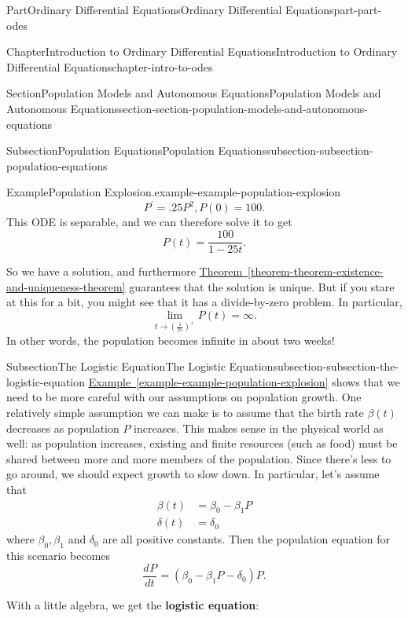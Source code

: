 \documentclass[twoside,10pt,]{book}
\newcommand{\xreffont}{\relax}
\newcommand{\terminology}[1]{\textbf{#1}}
\numberwithin{equation}{part}
\newcommand{\dv}[3][]{\dfrac{d^{#1} #2}{d #3^{#1}}}
\begin{document}
\begin{partptx}{Part}{Ordinary Differential Equations}{}{Ordinary Differential Equations}{}{}{part-part-odes}
\begin{chapterptx}{Chapter}{Introduction to Ordinary Differential Equations}{}{Introduction to Ordinary Differential Equations}{}{}{chapter-intro-to-odes}
\begin{sectionptx}{Section}{Population Models and Autonomous Equations}{}{Population Models and Autonomous Equations}{}{}{section-section-population-models-and-autonomous-equations}
\begin{subsectionptx}{Subsection}{Population Equations}{}{Population Equations}{}{}{subsection-subsection-population-equations}
\begin{example}{Example}{Population Explosion.}{example-example-population-explosion}
\begin{equation*}
P^\prime = .25P^{2}, P(0) = 100.
\end{equation*}
This ODE is separable, and we can therefore solve it to get%
\begin{equation*}
P(t) = \frac{100}{1 - 25t}.
\end{equation*}
%
\par
So we have a solution, and furthermore \hyperref[theorem-theorem-existence-and-uniqueness-theorem]{Theorem~{\xreffont\ref{theorem-theorem-existence-and-uniqueness-theorem}}} guarantees that the solution is unique. But if you stare at this for a bit, you might see that it has a divide-by-zero problem. In particular,%
\begin{equation*}
\lim_{t\to(\frac{1}{25})^{+}}P(t) = \infty.
\end{equation*}
In other words, the population becomes infinite in about two weeks!%
\end{example}
\end{subsectionptx}
%
%
\typeout{************************************************}
\typeout{************************************************}
%
\begin{subsectionptx}{Subsection}{The Logistic Equation}{}{The Logistic Equation}{}{}{subsection-subsection-the-logistic-equation}
\hyperref[example-example-population-explosion]{Example~{\xreffont\ref{example-example-population-explosion}}} shows that we need to be more careful with our assumptions on population growth. One relatively simple assumption we can make is to assume that the birth rate \(\beta(t)\) decreases as population \(P\) increases. This makes sense in the physical world as well: as population increases, existing and finite resources (such as food) must be shared between more and more members of the population. Since there's less to go around, we should expect growth to slow down. In particular, let's assume that%
\begin{align*}
\beta(t) & = \beta_{0} - \beta_{1}P \\
\delta(t) & = \delta_{0} 
\end{align*}
where \(\beta_{0},\beta_{1}\) and \(\delta_{0}\) are all positive constants. Then the population equation for this scenario becomes%
\begin{equation*}
\dv{P}{t} = (\beta_{0} - \beta_{1}P - \delta_{0})P.
\end{equation*}
%
\par
With a little algebra, we get the \terminology{logistic equation}:%

\end{subsectionptx}
\end{sectionptx}
\end{chapterptx}
\end{partptx}
\end{document}
